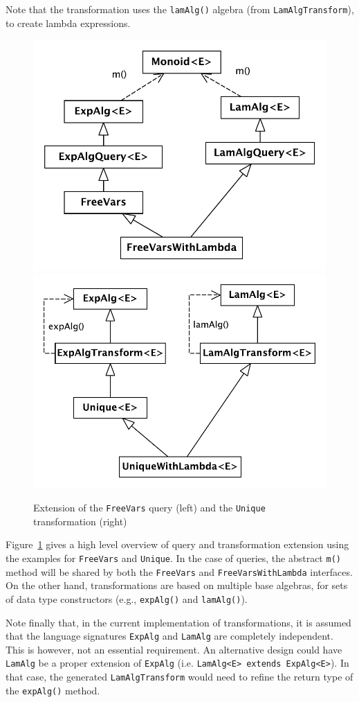 
\noindent Note that the transformation uses the \lstinline{lamAlg()} algebra (from \lstinline{LamAlgTransform}),
to create lambda expressions.


\begin{figure}[t]
  \centering
  \nocaptionrule
  \includegraphics[width=0.45\linewidth]{extendQuery}
  \hspace*{2pt}
  \vline
  \hspace*{2pt}
  \includegraphics[width=0.45\linewidth]{extendTransform}

  \caption{Extension of the \lstinline{FreeVars} query (left) and the \lstinline{Unique} transformation (right)}
  \label{FIG:extension}
\end{figure}


Figure~\ref{FIG:extension} gives a high level overview of query and transformation extension using the examples for \lstinline{FreeVars} and \lstinline{Unique}.
In the case of queries, the abstract \lstinline{m()} method will be shared by both the \lstinline{FreeVars} and \lstinline{FreeVarsWithLambda} interfaces.
On the other hand, transformations are based on multiple base algebras, for sets of data type constructors (e.g., \lstinline{expAlg()} and \lstinline{lamAlg()}).

Note finally that, in the current implementation of \name transformations, it is assumed that the language signatures \lstinline{ExpAlg} and \lstinline{LamAlg} are completely independent.
This is however, not an essential requirement.
An alternative design could have \lstinline{LamAlg} be a proper extension of \lstinline{ExpAlg} (i.e. \lstinline{LamAlg<E> extends ExpAlg<E>}).
In that case, the generated \lstinline{LamAlgTransform} would need to refine the return type of the \lstinline{expAlg()} method.


